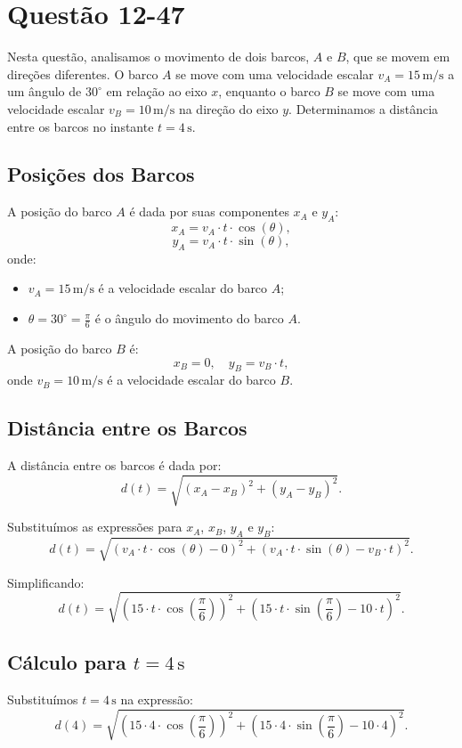 \section{Questão 12-47}

Nesta questão, analisamos o movimento de dois barcos, \(A\) e \(B\), que se movem em direções diferentes. O barco \(A\) se move com uma velocidade escalar \(v_A = 15 \, \text{m/s}\) a um ângulo de \(30^\circ\) em relação ao eixo \(x\), enquanto o barco \(B\) se move com uma velocidade escalar \(v_B = 10 \, \text{m/s}\) na direção do eixo \(y\). Determinamos a distância entre os barcos no instante \(t = 4 \, \text{s}\).

\subsection*{Posições dos Barcos}
A posição do barco \(A\) é dada por suas componentes \(x_A\) e \(y_A\):
\[
x_A = v_A \cdot t \cdot \cos(\theta),
\]
\[
y_A = v_A \cdot t \cdot \sin(\theta),
\]
onde:
\begin{itemize}
    \item \(v_A = 15 \, \text{m/s}\) é a velocidade escalar do barco \(A\);
    \item \(\theta = 30^\circ = \frac{\pi}{6}\) é o ângulo do movimento do barco \(A\).
\end{itemize}

A posição do barco \(B\) é:
\[
x_B = 0, \quad y_B = v_B \cdot t,
\]
onde \(v_B = 10 \, \text{m/s}\) é a velocidade escalar do barco \(B\).

\subsection*{Distância entre os Barcos}
A distância entre os barcos é dada por:
\[
d(t) = \sqrt{(x_A - x_B)^2 + (y_A - y_B)^2}.
\]

Substituímos as expressões para \(x_A\), \(x_B\), \(y_A\) e \(y_B\):
\[
d(t) = \sqrt{\left(v_A \cdot t \cdot \cos(\theta) - 0\right)^2 + \left(v_A \cdot t \cdot \sin(\theta) - v_B \cdot t\right)^2}.
\]

Simplificando:
\[
d(t) = \sqrt{\left(15 \cdot t \cdot \cos\left(\frac{\pi}{6}\right)\right)^2 + \left(15 \cdot t \cdot \sin\left(\frac{\pi}{6}\right) - 10 \cdot t\right)^2}.
\]

\subsection*{Cálculo para \(t = 4 \, \text{s}\)}
Substituímos \(t = 4 \, \text{s}\) na expressão:
\[
d(4) = \sqrt{\left(15 \cdot 4 \cdot \cos\left(\frac{\pi}{6}\right)\right)^2 + \left(15 \cdot 4 \cdot \sin\left(\frac{\pi}{6}\right) - 10 \cdot 4\right)^2}.
\]


